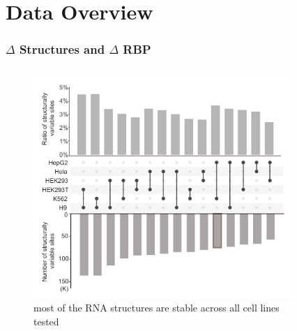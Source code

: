 \documentclass{ctexbeamer}
\begin{document}
\section{Data Overview}

\begin{frame}
  \frametitle{$\Delta$ Structures and $\Delta$ RBP}
  \begin{columns}[T]
    \begin{column}{0.5\textwidth}
      \begin{figure}[H]
        \raggedright
        \includegraphics[width=\textwidth]{./figures/SV.png}
        \caption{most of the RNA structures are stable across all cell lines tested}
        \label{fig:sv}
      \end{figure}
    \end{column}
    \begin{column}{0.5\textwidth}
        \begin{figure}[H]
        \raggedleft

\end{figure}
\end{column}
\end{columns}
\end{frame}
\end{document}
